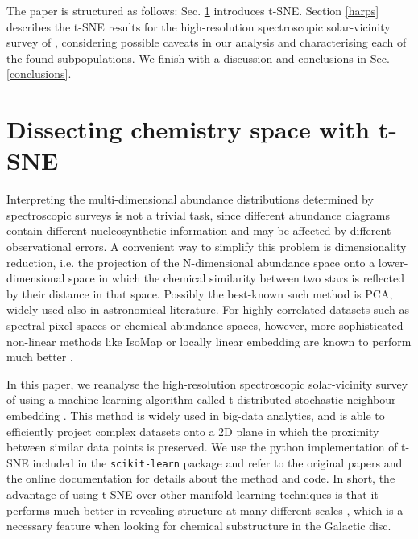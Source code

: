 \documentclass{aa}  %
\begin{document}
The paper is structured as follows: Sec. \ref{method} introduces t-SNE. Section \ref{harps} describes the t-SNE results for the high-resolution spectroscopic solar-vicinity survey of \citet{DelgadoMena2017}, considering possible caveats in our analysis and characterising each of the found subpopulations. We finish with a discussion and conclusions in Sec. \ref{conclusions}.

\section{Dissecting chemistry space with t-SNE}\label{method}

Interpreting the multi-dimensional abundance distributions determined by spectroscopic surveys is not a trivial task, since different abundance diagrams contain different nucleosynthetic information and may be affected by different observational errors. A convenient way to simplify this problem is dimensionality reduction, i.e. the projection of the N-dimensional abundance space onto a lower-dimensional space in which the chemical similarity between two stars is reflected by their distance in that space. Possibly the best-known such method is PCA, widely used also in astronomical literature. For highly-correlated datasets such as spectral pixel spaces or chemical-abundance spaces, however, more sophisticated non-linear methods like IsoMap or locally linear embedding are known to perform much better \citep[e.g.][]{Matijevivc2012, Ivezic2013}.

In this paper, we reanalyse the high-resolution spectroscopic solar-vicinity survey of \citet{DelgadoMena2017} using a machine-learning algorithm called t-distributed stochastic neighbour embedding \citep[t-SNE;][]{Hinton2003, vanderMaaten2008}. This method is widely used in big-data analytics, and is able to efficiently project complex datasets onto a 2D plane in which the proximity between similar data points is preserved. We use the python implementation of t-SNE included in the {\tt scikit-learn} package \citep{Pedregosa2012} and refer to the original papers and the online documentation for details about the method and code. In short, the advantage of using t-SNE over other manifold-learning techniques is that it performs much better in revealing structure at many different scales \citep{vanderMaaten2008, Matijevivc2017}, which is a necessary feature when looking for chemical substructure in the Galactic disc.
\end{document}
